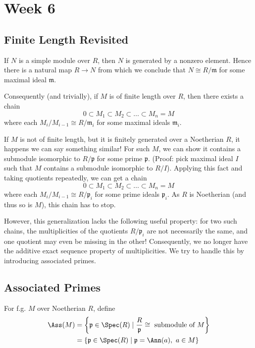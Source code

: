 \section{Week 6}

\subsection{Finite Length Revisited}

If $N$ is a simple module over $R$, then $N$ is generated by a nonzero element. Hence there is a natural map $R \to N$ from which we conclude that $N \cong R/\mathfrak m$ for some maximal ideal $\mathfrak m$.

Consequently (and trivially), if $M$ is of finite length over $R$, then there exists a chain
\[
    0 \subset M_1 \subset M_2 \subset \dots \subset M_n = M
\]
where each $M_i/M_{i-1} \cong R/\mathfrak m_i$ for some maximal ideals $\mathfrak m_i$.

If $M$ is not of finite length, but it is finitely generated over a Noetherian $R$, it happens we can say something similar! For such $M$, we can show it contains a submodule isomorphic to $R/\mathfrak p$ for some prime $\mathfrak p$. (Proof: pick maximal ideal $I$ such that $M$ contains a submodule isomorphic to $R/I$). Applying this fact and taking quotients repeatedly, we can get a chain
\[
    0 \subset M_1 \subset M_2 \subset \dots \subset M_n = M
\]
where each $M_i/M_{i-1} \cong R/\mathfrak p_i$ for some prime ideals $\mathfrak p_i$. As $R$ is Noetherian (and thus so is $M$), this chain has to stop.

However, this generalization lacks the following useful property: for two such chains, the multiplicities of the quotients $R/\mathfrak p_i$ are not necessarily the same, and one quotient may even be missing in the other! Consequently, we no longer have the additive exact sequence property of multiplicities. We try to handle this by introducing associated primes.

\subsection{Associated Primes}
For f.g. $M$ over Noetherian $R$, define
\[
    \begin{split}
        \Ass(M) & = \left\{\mathfrak p \in \Spec(R) \mid \frac{R}{\mathfrak p} \cong \text{ submodule of } M\right\} \\
                & = \{\mathfrak p \in \Spec(R) \mid \mathfrak p = \Ann(a), \ a \in M\}
    \end{split}
\]

